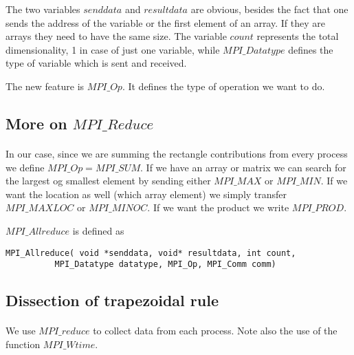 The two variables $senddata$ and $resultdata$ are obvious, besides the fact that one sends the address
of the variable or the first element of an array.  If they are arrays they need to have the same size. 
The variable $count$ represents the total dimensionality, 1 in case of just one variable, 
while $MPI\_Datatype$ 
defines the type of variable which is sent and received.  

The new feature is $MPI\_Op$. It defines the type
of operation we want to do.



\subsection*{More on $MPI\_Reduce$}

\paragraph{}
In our case, since we are summing
the rectangle  contributions from every process we define  $MPI\_Op = MPI\_SUM$.
If we have an array or matrix we can search for the largest og smallest element by sending either $MPI\_MAX$ or 
$MPI\_MIN$.  If we want the location as well (which array element) we simply transfer 
$MPI\_MAXLOC$ or $MPI\_MINOC$. If we want the product we write $MPI\_PROD$. 

$MPI\_Allreduce$ is defined as



\begin{verbatim}
MPI_Allreduce( void *senddata, void* resultdata, int count, 
          MPI_Datatype datatype, MPI_Op, MPI_Comm comm)        

\end{verbatim}



\subsection*{Dissection of trapezoidal rule}

\paragraph{}

We use $MPI\_reduce$ to collect data from each process. Note also the use of the function 
$MPI\_Wtime$. 








